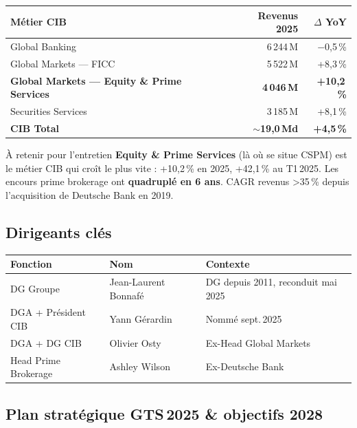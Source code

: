 \documentclass[11pt,a4paper]{article}
\begin{document}
\begin{center}
\small
\begin{tabular}{@{}lrr@{}}
\toprule
\textbf{M\'etier CIB} & \textbf{Revenus 2025} & \textbf{$\Delta$ YoY} \\
\midrule
Global Banking & 6\,244\,M\texteuro{} & $-$0,5\,\% \\
Global Markets --- FICC & 5\,522\,M\texteuro{} & +8,3\,\% \\
\textbf{Global Markets --- Equity \& Prime Services} & \textbf{4\,046\,M\texteuro{}} & \textbf{+10,2\,\%} \\
Securities Services & 3\,185\,M\texteuro{} & +8,1\,\% \\
\midrule
\textbf{CIB Total} & \textbf{$\sim$19,0\,Md\texteuro{}} & \textbf{+4,5\,\%} \\
\bottomrule
\end{tabular}
\end{center}

\begin{warnbox}{\`A retenir pour l'entretien}
\textbf{Equity \& Prime Services} (l\`a o\`u se situe CSPM) est le m\'etier CIB qui
cro\^it le plus vite : +10,2\,\% en 2025, +42,1\,\% au T1\,2025.
Les encours prime brokerage ont \textbf{quadrupl\'e en 6 ans}.
CAGR revenus >35\,\% depuis l'acquisition de Deutsche Bank en 2019.
\end{warnbox}

\subsection{Dirigeants cl\'es}

\begin{center}
\small
\begin{tabular}{@{}p{5cm}p{4cm}p{4.5cm}@{}}
\toprule
\textbf{Fonction} & \textbf{Nom} & \textbf{Contexte} \\
\midrule
DG Groupe & Jean-Laurent Bonnaf\'e & DG depuis 2011, reconduit mai 2025 \\
DGA + Pr\'esident CIB & Yann G\'erardin & Nomm\'e sept.\,2025 \\
DGA + DG CIB & Olivier Osty & Ex-Head Global Markets \\
Head Prime Brokerage & Ashley Wilson & Ex-Deutsche Bank \\
\bottomrule
\end{tabular}
\end{center}

\subsection{Plan strat\'egique GTS\,2025 \& objectifs 2028}
\end{document}
